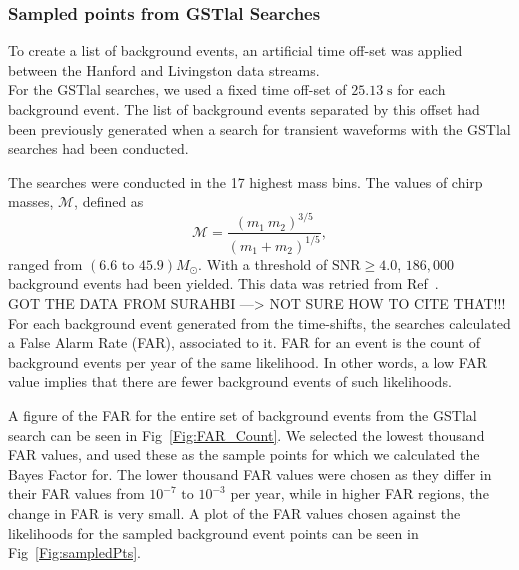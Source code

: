 \documentclass{article}
\begin{document}
 



\subsubsection{Sampled points from GSTlal Searches} \label{appendixGstlalandPycbc}


To create a list of background events, an artificial time off-set was applied between the Hanford and Livingston data streams.\\

For the GSTlal searches, we used a fixed time off-set of $25.13 \; \mathrm{s}$ for each background event. The list of background events separated by this offset had been previously generated when a search for transient waveforms with the GSTlal searches had been conducted. 

The searches were conducted in the 17 highest mass bins. The values of chirp masses, $\mathcal{M}$, defined as $$\mathcal{M} = \frac{(m_1 \ m_2)^{3/5}}{(m_1 + m_2)^{1/5}},$$ ranged from $(6.6  \text{ to } 45.9) M_{\odot}$. With a threshold of $\text{SNR} \geq 4.0$, $186,000$ background events had been yielded. This data was retried from Ref~\cite{}.\\


GOT THE DATA FROM SURAHBI ---> NOT SURE HOW TO CITE THAT!!!\\


  For each background event generated from the time-shifts, the searches calculated a False Alarm Rate (FAR), associated to it. FAR for an event is the count of background events per year of the same likelihood. In other words, a low FAR value implies that there are fewer background events of such likelihoods. 
  
  
  A figure of the FAR for the entire set of background events from the GSTlal search can be seen in Fig~\ref{Fig:FAR_Count}. We selected the lowest thousand FAR values, and used these as the sample points for which we calculated the Bayes Factor for. The lower thousand FAR values were chosen as they differ in their FAR values from $10^{-7} \text{ to } 10^{-3}$ per year, while in higher FAR regions, the change in FAR is very small. A plot of the FAR values chosen against the likelihoods for the sampled background event points can be seen in Fig~\ref{Fig:sampledPts}.  \\
  
\end{document}
